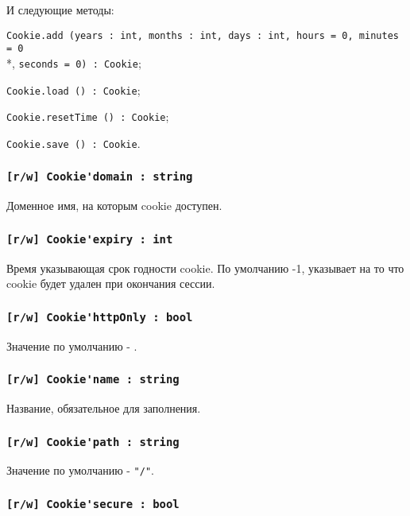 И следующие методы:
\begin{icItems}
	\item \lstinline|Cookie.add (years : int, months : int, days : int, hours = 0, minutes = 0|\\*, \lstinline|seconds = 0) : Cookie|;
	\item \lstinline|Cookie.load () : Cookie|;
	\item \lstinline|Cookie.resetTime () : Cookie|;
	\item \lstinline|Cookie.save () : Cookie|.
\end{icItems}

\subsubsection{\lstinline|[r/w] Cookie'domain : string|}

Доменное имя, на которым cookie доступен.

\subsubsection{\lstinline|[r/w] Cookie'expiry : int|}

Время указывающая срок годности cookie. По умолчанию -1, указывает на то что cookie будет удален при окончания сессии.

\subsubsection{\lstinline|[r/w] Cookie'httpOnly : bool|}

Значение по умолчанию - \false.

\subsubsection{\lstinline|[r/w] Cookie'name : string|}

Название, обязательное для заполнения.

\subsubsection{\lstinline|[r/w] Cookie'path : string|}

Значение по умолчанию - \lstinline|"/"|.

\subsubsection{\lstinline|[r/w] Cookie'secure : bool|}

